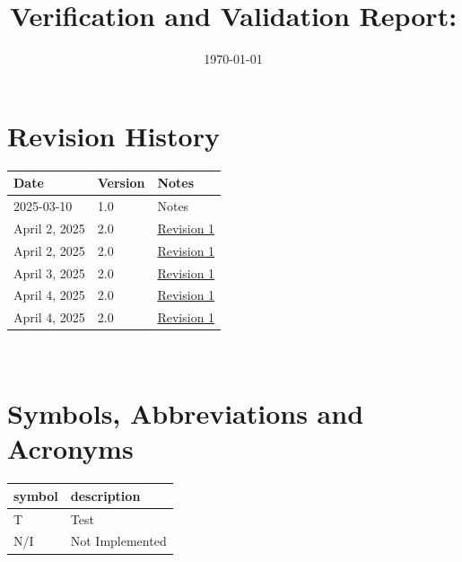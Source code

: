 \documentclass[12pt, titlepage]{article}
\begin{document}
\title{Verification and Validation Report: \progname} 
\author{\authname}
\date{\today}
	
\maketitle


\section{Revision History}

\begin{tabularx}{\textwidth}{p{3cm}p{2cm}X}
\toprule {\bf Date} & {\bf Version} & {\bf Notes}\\
\midrule
2025-03-10 & 1.0 & Notes\\
April 2, 2025 & 2.0 & \href{https://github.com/takhtart/PCD/issues/118}{Revision 1}\\
April 2, 2025 & 2.0 & \href{https://github.com/takhtart/PCD/issues/119}{Revision 1}\\
April 3, 2025 & 2.0 & \href{https://github.com/takhtart/PCD/issues/123}{Revision 1}\\
April 4, 2025 & 2.0 & \href{https://github.com/takhtart/PCD/issues/122}{Revision 1}\\
April 4, 2025 & 2.0 & \href{https://github.com/takhtart/PCD/issues/124}{Revision 1}\\
\bottomrule
\end{tabularx}

~\newpage

\section{Symbols, Abbreviations and Acronyms}

\renewcommand{\arraystretch}{1.2}
\begin{tabular}{l l} 
  \toprule		
  \textbf{symbol} & \textbf{description}\\
  \midrule 
  T & Test\\
  N/I & Not Implemented\\
  \bottomrule
\end{tabular}\\

\newpage

\tableofcontents

\listoftables %

\listoffigures %
\end{document}
